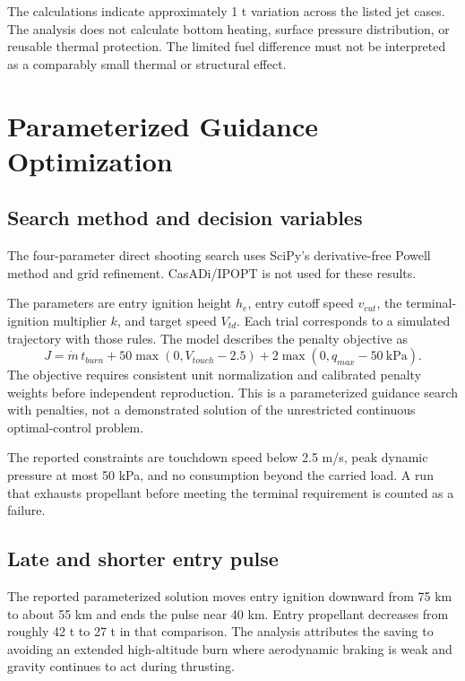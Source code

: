 \documentclass[11pt,a4paper]{article}
\begin{document}



The calculations indicate approximately 1 t variation across the listed jet cases. The analysis does not calculate bottom heating, surface pressure distribution, or reusable thermal protection. The limited fuel difference must not be interpreted as a comparably small thermal or structural effect.

\section{Parameterized Guidance Optimization}
\subsection{Search method and decision variables}
The four-parameter direct shooting search uses SciPy's derivative-free Powell method and grid refinement. CasADi/IPOPT is not used for these results.



The parameters are entry ignition height $h_e$, entry cutoff speed $v_{cut}$, the terminal-ignition multiplier $k$, and target speed $V_{td}$. Each trial corresponds to a simulated trajectory with those rules. The model describes the penalty objective as
\begin{equation}
 J=\dot m\,t_{burn}
 +50\max(0,V_{touch}-2.5)
 +2\max(0,q_{max}-50\ \mathrm{kPa}).
\label{eq:objective}
\end{equation}
The objective requires consistent unit normalization and calibrated penalty weights before independent reproduction. This is a parameterized guidance search with penalties, not a demonstrated solution of the unrestricted continuous optimal-control problem.

The reported constraints are touchdown speed below 2.5 m/s, peak dynamic pressure at most 50 kPa, and no consumption beyond the carried load. A run that exhausts propellant before meeting the terminal requirement is counted as a failure.

\subsection{Late and shorter entry pulse}


The reported parameterized solution moves entry ignition downward from 75 km to about 55 km and ends the pulse near 40 km. Entry propellant decreases from roughly 42 t to 27 t in that comparison. The analysis attributes the saving to avoiding an extended high-altitude burn where aerodynamic braking is weak and gravity continues to act during thrusting.
\end{document}
